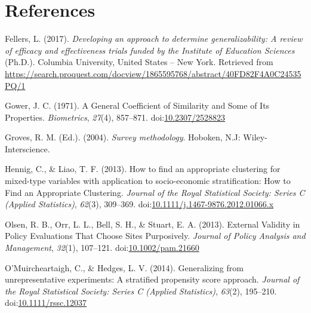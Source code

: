 \documentclass[man,floatsintext]{apa6}
\theoremstyle{definition}
\theoremstyle{definition}
\theoremstyle{definition}
\theoremstyle{remark}
\begin{document}
\newpage

\hypertarget{references}{%
\section{References}\label{references}}

\begingroup
\setlength{\parindent}{-0.5in}
\setlength{\leftskip}{0.5in}

\hypertarget{refs}{}
\leavevmode\hypertarget{ref-fellersDevelopingApproachDetermine2017}{}%
Fellers, L. (2017). \emph{Developing an approach to determine
generalizability: A review of efficacy and effectiveness trials funded
by the Institute of Education Sciences} (Ph.D.). Columbia University,
United States -- New York. Retrieved from
\url{https://search.proquest.com/docview/1865595768/abstract/40FD82F4A0C24535PQ/1}

\leavevmode\hypertarget{ref-gowerGeneralCoefficientSimilarity1971}{}%
Gower, J. C. (1971). A General Coefficient of Similarity and Some of Its
Properties. \emph{Biometrics}, \emph{27}(4), 857--871.
doi:\href{https://doi.org/10.2307/2528823}{10.2307/2528823}

\leavevmode\hypertarget{ref-grovesSurveyMethodology2004}{}%
Groves, R. M. (Ed.). (2004). \emph{Survey methodology}. Hoboken, N.J:
Wiley-Interscience.

\leavevmode\hypertarget{ref-hennigHowFindAppropriate2013}{}%
Hennig, C., \& Liao, T. F. (2013). How to find an appropriate clustering
for mixed-type variables with application to socio-economic
stratification: How to Find an Appropriate Clustering. \emph{Journal of
the Royal Statistical Society: Series C (Applied Statistics)},
\emph{62}(3), 309--369.
doi:\href{https://doi.org/10.1111/j.1467-9876.2012.01066.x}{10.1111/j.1467-9876.2012.01066.x}

\leavevmode\hypertarget{ref-olsenExternalValidityPolicy2013}{}%
Olsen, R. B., Orr, L. L., Bell, S. H., \& Stuart, E. A. (2013). External
Validity in Policy Evaluations That Choose Sites Purposively.
\emph{Journal of Policy Analysis and Management}, \emph{32}(1),
107--121.
doi:\href{https://doi.org/10.1002/pam.21660}{10.1002/pam.21660}

\leavevmode\hypertarget{ref-omuircheartaighGeneralizingUnrepresentativeExperiments2014}{}%
O'Muircheartaigh, C., \& Hedges, L. V. (2014). Generalizing from
unrepresentative experiments: A stratified propensity score approach.
\emph{Journal of the Royal Statistical Society: Series C (Applied
Statistics)}, \emph{63}(2), 195--210.
doi:\href{https://doi.org/10.1111/rssc.12037}{10.1111/rssc.12037}
\end{document}
